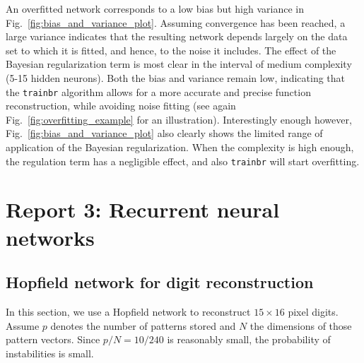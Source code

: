 \documentclass[pdftex,11pt,a4paper]{article}
\begin{document}
An overfitted network corresponds to a low bias but high variance in Fig.~\ref{fig:bias_and_variance_plot}. Assuming convergence has been reached, a large variance indicates that the resulting network depends largely on the data set to which it is fitted, and hence, to the noise it includes. The effect of the Bayesian regularization term is most clear in the interval of medium complexity (5-15 hidden neurons). Both the bias and variance remain low, indicating that the \texttt{trainbr} algorithm allows for a more accurate and precise function reconstruction, while avoiding noise fitting (see again Fig.~\ref{fig:overfitting_example} for an illustration). Interestingly enough however, Fig.~\ref{fig:bias_and_variance_plot} also clearly shows the limited range of application of the Bayesian regularization. When the complexity is high enough, the regulation term has a negligible effect, and also \texttt{trainbr} will start overfitting.



\section{Report 3: Recurrent neural networks}
\subsection{Hopfield network for digit reconstruction}
In this section, we use a Hopfield network to reconstruct $15 \times 16$ pixel digits. Assume $p$ denotes the number of patterns stored and $N$ the dimensions of those pattern vectors. Since $p/N = 10/240$ is reasonably small, the probability of instabilities is small.
\end{document}
